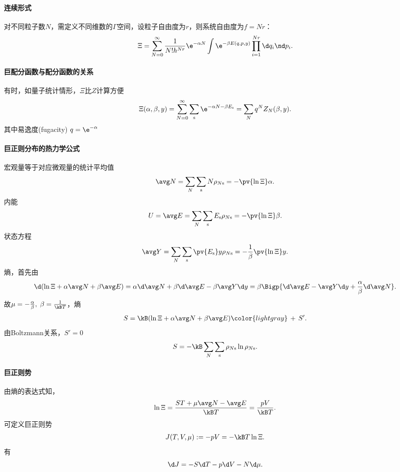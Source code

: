 \paragraph{连续形式}对不同粒子数$N$，需定义不同维数的$\Gamma$空间，设粒子自由度为$r$，则系统自由度为$f=Nr$：
\begin{align}
	\Xi=\sum_{N=0}^\infty\frac1{N!h^{Nr}}\e^{-\alpha N}\int\e^{-\beta E(q,p,y)}\prod_{i=1}^{Nr}\d q_i\nd p_i.
\end{align}
\paragraph{巨配分函数与配分函数的关系}有时，如量子统计情形，$\Xi$比$Z$计算方便
\[
	\Xi(\alpha,\beta,y)=\sum_{N=0}^\infty\sum_\st\e^{-\alpha N-\beta E_\st}=\sum_Nq^NZ_N(\beta,y).
\]
其中易逸度(fugacity) $q=\e^{-\alpha}$

\paragraph{巨正则分布的热力学公式}宏观量等于对应微观量的统计平均值
\begin{align}
	\avg N=\sum_N\sum_\st N\rho_{N\st}=-\pv{\ln\Xi}\alpha.
\end{align}
内能
\begin{align}
	U=\avg E=\sum_N\sum_\st E_\st\rho_{N\st}=-\pv{\ln\Xi}\beta.
\end{align}
状态方程
\begin{align}
	\avg Y=\sum_N\sum_\st\pv{E_\st}y\rho_{N\st}=-\frac1\beta\pv{\ln\Xi}y.
\end{align}
熵，首先由
\begin{align*}
	\d(\ln\Xi+\alpha\avg N+\beta\avg E)=\alpha\d\avg N+\beta\d\avg E-\beta\avg Y\d y=\beta\Bigp{\d\avg E-\avg Y\d y+\frac\alpha\beta\d\avg N}.
\end{align*}
故$\mu=-\frac\alpha\beta,\;\beta=\frac1{\kB T}$，熵
\begin{align}
	S=\kB(\ln\Xi+\alpha\avg N+\beta\avg E){\color{lightgray}\,+\,S'}.
\end{align}
由Boltzmann关系，$S'=0$
\begin{align}
	S=-\kB\sum_N\sum_\st\rho_{N\st}\ln\rho_{N\st}.
\end{align}
\paragraph{巨正则势}
由熵的表达式知，
\[
	\ln\Xi=\frac{ST+\mu\avg N-\avg E}{\kB T}=\frac{pV}{\kB T}.
\]
可定义巨正则势
\begin{align}
	J(T,V,\mu):=-pV=-\kB T\ln\Xi.
\end{align}
有
\[
	\d J=-S\d T-p\d V-N\d\mu.
\]
